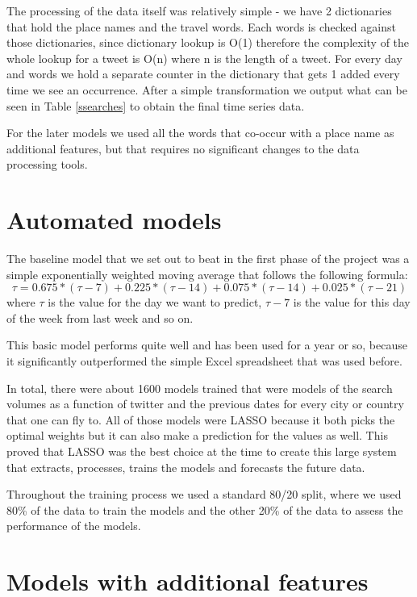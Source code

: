\documentclass[minf,twoside,singlespacing,parskip,frontabs,notimes,12pt]{infthesis} %
\begin{document}
 The processing of the data itself was relatively simple - we have 2 dictionaries that hold the place names and the travel words. Each words is checked against those dictionaries, since dictionary lookup is O(1) therefore the complexity of the whole lookup for a tweet is O(n) where n is the length of a tweet. For every day and words we hold a separate counter in the dictionary that gets 1 added every time we see an occurrence. After a simple transformation we output what can be seen in Table \ref{ssearches} to obtain the final time series data. 
 
 For the later models we used all the words that co-occur with a place name as additional features, but that requires no significant changes to the data processing tools. 


\section{Automated models}

The baseline model that we set out to beat in the first phase of the project was a simple exponentially weighted moving average that follows the following formula:
\begin{equation}
\tau=0.675*(\tau-7) + 0.225*(\tau-14) + 0.075*(\tau-14) + 0.025*(\tau-21)
\end{equation}
where $\tau$ is the value for the day we want to predict, $\tau-7$ is the value for this day of the week from last week and so on.

This basic model performs quite well and has been used for a year or so, because it significantly outperformed the simple Excel spreadsheet that was used before. 

In total, there were about 1600 models trained that were models of the search volumes as a function of twitter and the previous dates for every city or country that one can fly to. All of those models were LASSO because it both picks the optimal weights but it can also make a prediction for the values as well. This proved that LASSO was the best choice at the time to create this large system that extracts, processes, trains the models and forecasts the future data. 

Throughout the training process we used a standard 80/20 split, where we used 80\% of the data to train the models and the other 20\% of the data to assess the performance of the models. 

\section{Models with additional features}
\end{document}
